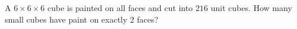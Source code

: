 A $6\times6\times6$ cube is painted on all faces and cut into $216$ unit cubes. How many small cubes have paint on exactly $2$ faces?
